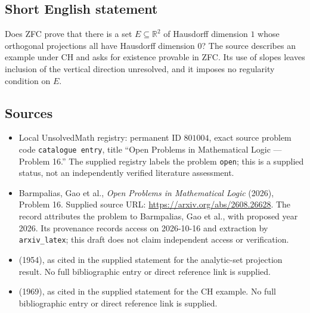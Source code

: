 \documentclass[11pt]{article}
\newcommand{\R}{\mathbb{R}}
\begin{document}
\subsection{Short English statement}
Does ZFC prove that there is a set \(E\subseteq\R^2\) of Hausdorff dimension \(1\) whose orthogonal projections all have Hausdorff dimension \(0\)? The source describes an example under CH and asks for existence provable in ZFC. Its use of slopes leaves inclusion of the vertical direction unresolved, and it imposes no regularity condition on \(E\).
\subsection{Sources}
\begin{itemize}
\item Local UnsolvedMath registry: permanent ID \(801004\), exact source problem code \texttt{catalogue entry}, title ``Open Problems in Mathematical Logic — Problem 16.'' The supplied registry labels the problem \texttt{open}; this is a supplied status, not an independently verified literature assessment.
\item Barmpalias, Gao et al., \emph{Open Problems in Mathematical Logic} (2026), Problem 16. Supplied source URL: \url{https://arxiv.org/abs/2608.26628}. The record attributes the problem to Barmpalias, Gao et al., with proposed year 2026. Its provenance records access on 2026-10-16 and extraction by \texttt{arxiv\_latex}; this draft does not claim independent access or verification.
\item [Mar] (1954), as cited in the supplied statement for the analytic-set projection result. No full bibliographic entry or direct reference link is supplied.
\item [Dav] (1969), as cited in the supplied statement for the CH example. No full bibliographic entry or direct reference link is supplied.
\end{itemize}
\end{document}
